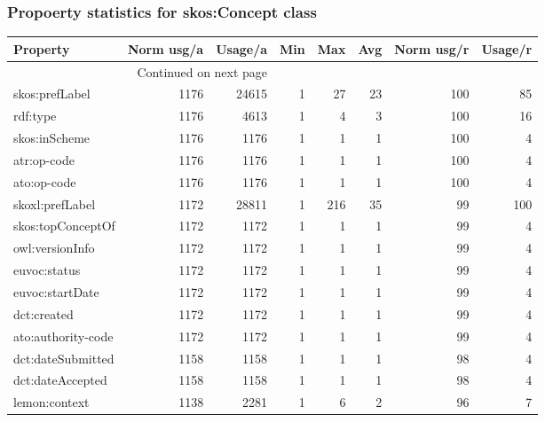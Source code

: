 \documentclass[10pt,a4paper,titlepage,final]{article}
\begin{document}
\subsubsection{Propoerty statistics for skos:Concept class}
\begin{longtable}{lrrrrrrr}
\toprule
               Property &  Norm usg/a &  Usage/a &  Min &  Max &  Avg &  Norm usg/r &  Usage/r \\
\midrule
\endhead
\midrule
\multicolumn{3}{r}{{Continued on next page}} \\
\midrule
\endfoot

\bottomrule
\endlastfoot
         skos:prefLabel &        1176 &    24615 &    1 &   27 &   23 &         100 &       85 \\
               rdf:type &        1176 &     4613 &    1 &    4 &    3 &         100 &       16 \\
          skos:inScheme &        1176 &     1176 &    1 &    1 &    1 &         100 &        4 \\
            atr:op-code &        1176 &     1176 &    1 &    1 &    1 &         100 &        4 \\
            ato:op-code &        1176 &     1176 &    1 &    1 &    1 &         100 &        4 \\
        skoxl:prefLabel &        1172 &    28811 &    1 &  216 &   35 &          99 &      100 \\
      skos:topConceptOf &        1172 &     1172 &    1 &    1 &    1 &          99 &        4 \\
        owl:versionInfo &        1172 &     1172 &    1 &    1 &    1 &          99 &        4 \\
           euvoc:status &        1172 &     1172 &    1 &    1 &    1 &          99 &        4 \\
        euvoc:startDate &        1172 &     1172 &    1 &    1 &    1 &          99 &        4 \\
            dct:created &        1172 &     1172 &    1 &    1 &    1 &          99 &        4 \\
     ato:authority-code &        1172 &     1172 &    1 &    1 &    1 &          99 &        4 \\
      dct:dateSubmitted &        1158 &     1158 &    1 &    1 &    1 &          98 &        4 \\
       dct:dateAccepted &        1158 &     1158 &    1 &    1 &    1 &          98 &        4 \\
          lemon:context &        1138 &     2281 &    1 &    6 &    2 &          96 &        7 \\

\end{longtable}
\end{document}
